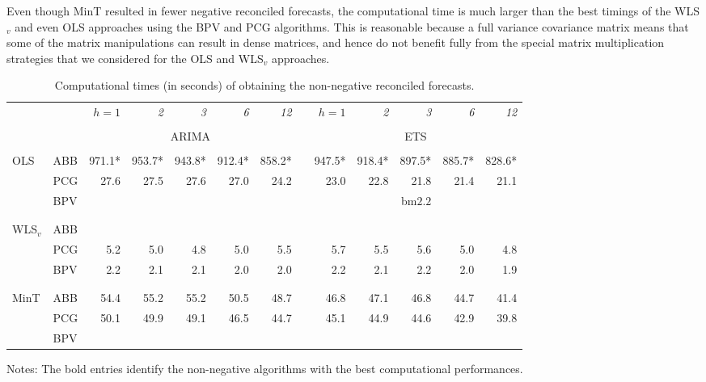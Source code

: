 \documentclass[11pt]{article}
\newcommand{\0}{\phantom{0}}
\begin{document}
Even though MinT resulted in fewer negative reconciled forecasts, the computational time is much larger than the best timings of the WLS$_{v}$ and even OLS approaches using the BPV and PCG algorithms. This is reasonable because a full variance covariance matrix means that some of the matrix manipulations can result in dense matrices, and hence do not benefit fully from the special matrix multiplication strategies that we considered for the OLS and WLS$_{v}$ approaches.

\begin{table}[p]
	\centering
	\fontsize{9}{12}\rm\tabcolsep=0.13cm
	\caption{Computational times (in seconds) of obtaining the non-negative reconciled forecasts.}
	\label{tbl:timingap}
	\begin{threeparttable}
		\begin{tabular}{llrrrrrrrrrrr}
			\toprule
			& & \it{$h=1$} & \it{2} & \it{3} & \it{6} & \it{12} & & \it{$h=1$} & \it{2} & \it{3} & \it{6} & \it{12} \\
			\cline{3-7} \cline{9-13} \\[-0.3cm]
			& & \multicolumn{5}{c}{ARIMA} & & \multicolumn{5}{c}{ETS} \\\cline{3-7} \cline{9-13}\\[-0.3cm]
			OLS & ABB & 971.1* & 953.7* & 943.8* & 912.4* & 858.2* & & 947.5* & 918.4* & 897.5* & 885.7* & 828.6* \\
			& PCG & 27.6 & 27.5 & 27.6 & 27.0 & 24.2 & & 23.0 & 22.8 & 21.8 & 21.4 & 21.1 \\
			& BPV & \bm{$3.0$} & \bm{$2.8$} & \bm{$2.9$} & \bm{$2.8$} & \bm{$2.6$} & & \bm{$2.3$} & \bm{$2.3$} & bm{$2.2$} & \bm{$2.1$} & \bm{$2.0$} \\ \\[-0.3cm]
			\cline{3-7} \cline{9-13} \\[-0.3cm]
			WLS$_{v}$ & ABB & \bm{$2.0$} & \bm{$1.9$} & \bm{$1.9$} & \bm{$1.9$} & \bm{$1.8$} & & \bm{$2.1$} & \bm{$2.0$} & \bm{$2.0$} & \bm{$1.9$} & \bm{$1.8$} \\
			& PCG & 5.2 & 5.0 & 4.8 & 5.0 & 5.5 & & 5.7 & 5.5 & 5.6 & 5.0 & 4.8 \\
			& BPV & 2.2 & 2.1 & 2.1 & 2.0 & 2.0 & & 2.2 & 2.1 & 2.2 & 2.0 & 1.9 \\ \\[-0.3cm]
			\cline{3-7} \cline{9-13} \\[-0.3cm]
			MinT & ABB & 54.4 & 55.2 & 55.2 & 50.5 & 48.7 & & 46.8 & 47.1 & 46.8 & 44.7 & 41.4 \\
			& PCG & 50.1 & 49.9 & 49.1 & 46.5 & 44.7 & & 45.1 & 44.9 & 44.6 & 42.9 & 39.8 \\
			& BPV & \bm{$38.4$} & \bm{$37.8$} & \bm{$37.5$} & \bm{$36.2$} & \bm{$33.7$} & & \bm{$38.2$} & \bm{$37.7$} & \bm{$37.3$} & \bm{$36.0$} & \bm{$33.6$} \\
			\bottomrule
		\end{tabular}
		\begin{tablenotes}
			\item [] Notes: The bold entries identify the non-negative algorithms with the best computational performances.
		\end{tablenotes}
	\end{threeparttable}
\end{table}
\end{document}

